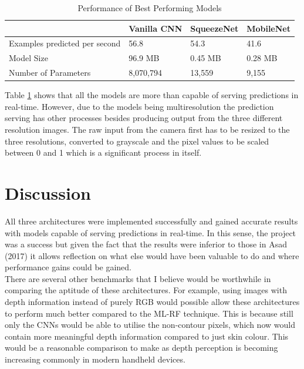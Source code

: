 \documentclass{article}
\begin{document}
{\begin{table}[h!]
  \begin{center}
    \caption{Performance of Best Performing Models}
    \label{tab:speed}
    \begin{tabular}{l|l|l|l}
      \textbf{} & \textbf{Vanilla CNN} &  \textbf{SqueezeNet} & \textbf{MobileNet}  \\
      \hline
      Examples predicted per second & 56.8 & 54.3 & 41.6 \\
      Model Size & 96.9 MB  & 0.45 MB & 0.28 MB \\
      Number of Parameters & 8,070,794 & 13,559 & 9,155\\
    \end{tabular}
  \end{center}
\end{table}

Table \ref{tab:speed} shows that all the models are more than capable of serving predictions in real-time. However, due to the models being multiresolution the prediction serving has other processes besides producing output from the three different resolution images. The raw input from the camera first has to be resized to the three resolutions, converted to grayscale and the pixel values to be scaled between 0 and 1 which is a significant process in itself.


\section{Discussion}
All three architectures were implemented successfully and gained accurate results with models capable of serving predictions in real-time. In this sense, the project was a success but given the fact that the results were inferior to those in Asad (2017) it allows reflection on what else would have been valuable to do and where performance gains could be gained. \\

There are several other benchmarks that I believe would be worthwhile in comparing the aptitude of these architectures. For example, using images with depth information instead of purely RGB would possible allow these architectures to perform much better compared to the ML-RF technique. This is because still only the CNNs would be able to utilise the non-contour pixels, which now would contain more meaningful depth information compared to just skin colour. This would be a reasonable comparison to make as depth perception is becoming increasing commonly in modern handheld devices. \\

}
\end{document}
